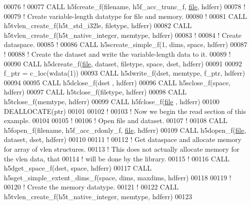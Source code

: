 \begin{DoxyCode}
00076   \textcolor{comment}{!}
00077   \textcolor{keyword}{CALL }h5fcreate\_f(filename, h5f\_acc\_trunc\_f, \hyperlink{structfile}{file}, hdferr)
00078   \textcolor{comment}{!}
00079   \textcolor{comment}{! Create variable-length datatype for file and memory.}
00080   \textcolor{comment}{!}
00081   \textcolor{keyword}{CALL }h5tvlen\_create\_f(h5t\_std\_i32le, filetype, hdferr)
00082   \textcolor{keyword}{CALL }h5tvlen\_create\_f(h5t\_native\_integer, memtype, hdferr)
00083   \textcolor{comment}{!}
00084   \textcolor{comment}{! Create dataspace.}
00085   \textcolor{comment}{!}
00086   \textcolor{keyword}{CALL }h5screate\_simple\_f(1, dims, space, hdferr)
00087   \textcolor{comment}{!}
00088   \textcolor{comment}{! Create the dataset and write the variable-length data to it.}
00089   \textcolor{comment}{!}
00090   \textcolor{keyword}{CALL }h5dcreate\_f(\hyperlink{structfile}{file}, dataset, filetype, space, dset, hdferr)
00091  
00092   f\_ptr = c\_loc(wdata(1))
00093   \textcolor{keyword}{CALL }h5dwrite\_f(dset, memtype, f\_ptr, hdferr)
00094 
00095   \textcolor{keyword}{CALL }h5dclose\_f(dset , hdferr)
00096   \textcolor{keyword}{CALL }h5sclose\_f(space, hdferr)
00097   \textcolor{keyword}{CALL }h5tclose\_f(filetype, hdferr)
00098   \textcolor{keyword}{CALL }h5tclose\_f(memtype, hdferr)
00099   \textcolor{keyword}{CALL }h5fclose\_f(\hyperlink{structfile}{file} , hdferr)
00100   \textcolor{keyword}{DEALLOCATE}(ptr)
00101 
00102   \textcolor{comment}{!}
00103   \textcolor{comment}{! Now we begin the read section of this example.}
00104 
00105   \textcolor{comment}{!}
00106   \textcolor{comment}{! Open file and dataset.}
00107   \textcolor{comment}{!}
00108   \textcolor{keyword}{CALL }h5fopen\_f(filename, h5f\_acc\_rdonly\_f, \hyperlink{structfile}{file}, hdferr)
00109   \textcolor{keyword}{CALL }h5dopen\_f(\hyperlink{structfile}{file}, dataset, dset, hdferr)
00110 
00111   \textcolor{comment}{!}
00112   \textcolor{comment}{! Get dataspace and allocate memory for array of vlen structures.}
00113   \textcolor{comment}{! This does not actually allocate memory for the vlen data, that}
00114   \textcolor{comment}{! will be done by the library.}
00115   \textcolor{comment}{!}
00116   \textcolor{keyword}{CALL }h5dget\_space\_f(dset, space, hdferr)
00117   \textcolor{keyword}{CALL }h5sget\_simple\_extent\_dims\_f(space, dims, maxdims, hdferr) 
00118 
00119   \textcolor{comment}{!}
00120   \textcolor{comment}{! Create the memory datatype.}
00121   \textcolor{comment}{!}
00122   \textcolor{keyword}{CALL }h5tvlen\_create\_f(h5t\_native\_integer, memtype, hdferr)
00123 

\end{DoxyCode}
